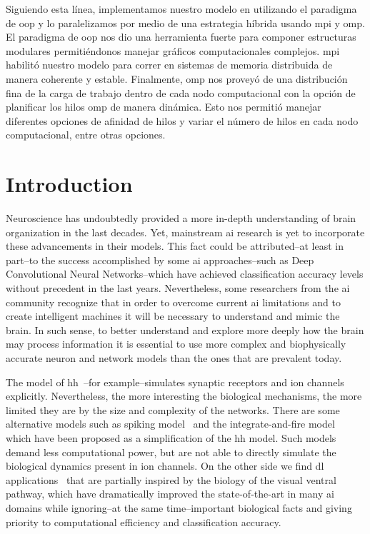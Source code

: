 {Siguiendo esta línea, implementamos nuestro modelo en  utilizando el paradigma de \gls{oop} y lo paralelizamos por medio de una estrategia híbrida usando \gls{mpi} y \gls{omp}.
El paradigma de \gls{oop} nos dio una herramienta fuerte para componer estructuras modulares permitiéndonos manejar gráficos computacionales complejos. \gls{mpi} habilitó nuestro modelo para correr en sistemas de memoria distribuida de manera coherente y estable.
Finalmente, \gls{omp} nos proveyó de una distribución fina de la carga de trabajo dentro de cada nodo computacional con la opción de planificar los hilos \gls{omp} de manera dinámica.
Esto nos permitió manejar diferentes opciones de afinidad de hilos y variar el número de hilos en cada nodo computacional, entre otras opciones.
}{
\section{Introduction}

Neuroscience has undoubtedly provided a more in-depth understanding of brain organization in the last decades. Yet, mainstream \gls{ai} research is yet to incorporate these advancements in their models. This fact could be attributed--at least in part--to the success accomplished by some \gls{ai} approaches--such as Deep Convolutional Neural Networks--which have achieved classification accuracy levels without precedent in the last years. Nevertheless, some researchers from the \gls{ai} community recognize that in order to overcome current \gls{ai} limitations and to create intelligent machines it will be necessary to understand and mimic the brain. In such sense, to better understand and explore more deeply how the brain may process information it is essential to use more complex and biophysically accurate neuron and network models than the ones that are prevalent today.

The model of \gls{hh}~\cite{HODGKIN199025}--for example--simulates synaptic receptors and ion channels explicitly. Nevertheless, the more interesting the biological mechanisms, the more limited they are by the size and complexity of the networks. There are some alternative models such as spiking model~\cite{Izhikevich2004SpiketimingDO} and the integrate-and-fire model~\cite{1333071} which have been proposed as a simplification of the \gls{hh} model. Such models demand less computational power, but are not able to directly simulate the biological dynamics present in ion channels. On the other side we find \gls{dl} applications~\cite{lecun_deep_2015} that are partially inspired by the biology of the visual ventral pathway, which have dramatically improved the state-of-the-art in many \gls{ai} domains while ignoring--at the same time--important biological facts and giving priority to computational efficiency and classification accuracy. 

}
